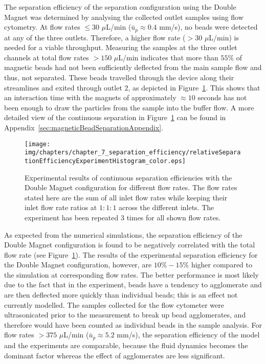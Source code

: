 The separation efficiency of the separation configuration using the Double Magnet was determined by analysing the collected outlet samples using flow cytometry. At flow rates $\leq30$ $\mu$L/min ($\bar{u}_{p}\approx0.4$ mm/s), no beads were detected at any of the three outlets. Therefore, a higher flow rate ($>30$ $\mu$L/min) is needed for a viable throughput. Measuring the samples at the three outlet channels at total flow rates $>150$ $\mu$L/min indicates that more than $55\%$ of magnetic beads had not been sufficiently deflected from the main sample flow and thus, not separated. These beads travelled through the device along their streamlines and exited through outlet 2, as depicted in Figure~\ref{fig:relativeSeparationEfficiencyContineousExperimentDoubleConfiguration}. This shows that an interaction time with the magnets of approximately $\approx10$ seconds has not been enough to draw the particles from the sample into the buffer flow. A more detailed view of the continuous separation in Figure~\ref{fig:relativeSeparationEfficiencyContineousExperimentDoubleConfiguration} can be found in Appendix~\ref{sec:magneticBeadSeparationAppendix}.

\begin{figure}[htb]
   \centering
   \texttt{[image: img/chapters/chapter\_7\_separation\_efficiency/relativeSeparationEfficiencyExperimentHistogram\_color.eps]}
   \caption[Experimental magnetic bead separation efficiency of the Double Magnet configuration in continuous flow]{Experimental results of continuous separation efficiencies with the Double Magnet configuration for different flow rates. The flow rates stated here are the sum of all inlet flow rates while keeping their inlet flow rate ratios at $1:1:1$ across the different inlets. The experiment has been repeated $3$ times for all shown flow rates.}
   \label{fig:relativeSeparationEfficiencyContineousExperimentDoubleConfiguration}
\end{figure}

As expected from the numerical simulations, the separation efficiency of the Double Magnet configuration is found to be negatively correlated with the total flow rate (see Figure~\ref{fig:relativeSeparationEfficiencyContineousExperimentDoubleConfiguration}). The results of the experimental separation efficiency for the Double Magnet configuration, however, are $10\%-15\%$ higher compared to the simulation at corresponding flow rates. The better performance is most likely due to the fact that in the experiment, beads have a tendency to agglomerate and are then deflected more quickly than individual beads; this is an effect not currently modelled. The samples collected for the flow cytometer were ultrasonicated prior to the measurement to break up bead agglomerates, and therefore would have been counted as individual beads in the sample analysis. For flow rates $>375$ $\mu$L/min ($\bar{u}_{p}\approx5.2$ mm/s), the separation efficiency of the model and the experiments are comparable, because the fluid dynamics becomes the dominant factor whereas the effect of agglomerates are less significant.

